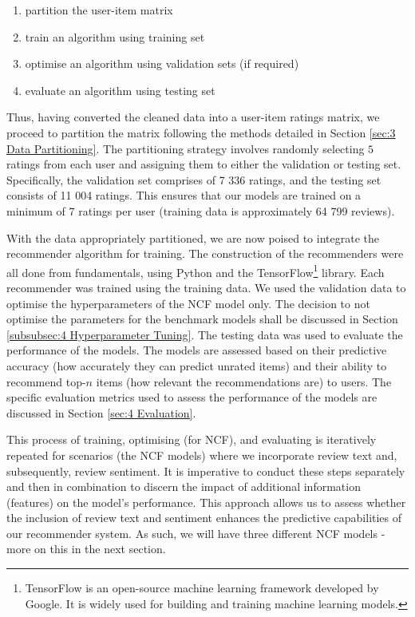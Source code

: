\begin{enumerate}
    \item partition the user-item matrix
    \item train an algorithm using training set
    \item optimise an algorithm using validation sets (if required)
    \item evaluate an algorithm using testing set
\end{enumerate}

Thus, having converted the cleaned data into a user-item ratings matrix, we proceed to partition the matrix following the methods detailed in Section \ref{sec:3 Data Partitioning}. The partitioning strategy involves randomly selecting $5$ ratings from each user and assigning them to either the validation or testing set. Specifically, the validation set comprises of 7 336 ratings, and the testing set consists of 11 004 ratings. This ensures that our models are trained on a minimum of 7 ratings per user (training data is approximately 64 799 reviews).

With the data appropriately partitioned, we are now poised to integrate the recommender algorithm for training. The construction of the recommenders were all done from fundamentals, using Python and the TensorFlow\footnote{TensorFlow is an open-source machine learning framework developed by Google. It is widely used for building and training machine learning models.} library. Each recommender was trained using the training data. We used the validation data to optimise the hyperparameters of the NCF model only. The decision to not optimise the parameters for the benchmark models shall be discussed in Section \ref{subsubsec:4 Hyperparameter Tuning}. The testing data was used to evaluate the performance of the models.  The models are assessed based on their predictive accuracy (how accurately they can predict unrated items) and their ability to recommend top-$n$ items (how relevant the recommendations are) to users. The specific evaluation metrics used to assess the performance of the models are discussed in Section \ref{sec:4 Evaluation}.

This process of training, optimising (for NCF), and evaluating is iteratively repeated for scenarios (the NCF models) where we incorporate review text and, subsequently, review sentiment. It is imperative to conduct these steps separately and then in combination to discern the impact of additional information (features) on the model's performance. This approach allows us to assess whether the inclusion of review text and sentiment enhances the predictive capabilities of our recommender system. As such, we will have three different NCF models - more on this in the next section. 

